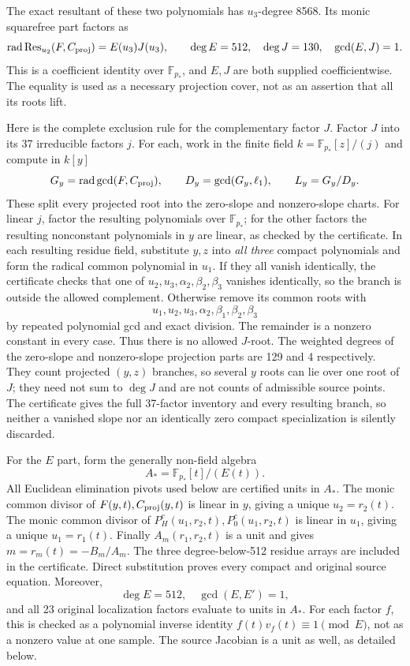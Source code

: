 \documentclass[11pt,a4paper]{article}
\theoremstyle{remark}\newtheorem{remark}[theorem]{Remark}
\begin{document}
The exact resultant of these two polynomials has $u_3$-degree 8568.
Its monic squarefree part factors as
\begin{equation}\label{generic:projectionfactor}
 \operatorname{rad}\operatorname{Res}_{u_2}(F,C_{\rm proj})
   =E(u_3)J(u_3),\qquad \deg E=512,\quad\deg J=130,
 \quad\gcd(E,J)=1.
\end{equation}
This is a coefficient identity over $\mathbb F_{p_*}$, and $E,J$ are
both supplied coefficientwise. The equality is used as a necessary
projection cover, not as an assertion that all its roots lift.

Here is the complete exclusion rule for the complementary factor $J$.
Factor $J$ into its 37 irreducible factors $j$. For each, work in the
finite field $k=\mathbb F_{p_*}[z]/(j)$ and compute in $k[y]$
\[
 G_y=\operatorname{rad}\gcd(F,C_{\rm proj}),\qquad
 D_y=\gcd(G_y,\ell_1),\qquad L_y=G_y/D_y.
\]
These split every projected root into the zero-slope and nonzero-slope
charts. For linear $j$, factor the resulting polynomials over
$\mathbb F_{p_*}$; for the other factors the resulting nonconstant
polynomials in $y$ are linear, as checked by the certificate. In each
resulting residue field, substitute $y,z$ into \emph{all three} compact
polynomials and form the radical common polynomial in $u_1$.
If they all vanish identically, the certificate checks that one of
$u_2,u_3,\alpha_2,\beta_2,\beta_3$ vanishes identically, so the branch
is outside the allowed complement. Otherwise remove its common roots
with
\[
 u_1,u_2,u_3,\alpha_2,\beta_1,\beta_2,\beta_3
\]
by repeated polynomial gcd and exact division. The remainder is a nonzero
constant in every case. Thus there is no allowed $J$-root. The weighted
degrees of the zero-slope and nonzero-slope projection parts are 129 and
4 respectively. They count projected $(y,z)$ branches, so several $y$
roots can lie over one root of $J$; they need not sum to $\deg J$ and
are not counts of admissible source points.
The certificate gives the full 37-factor inventory and every resulting
branch, so neither a vanished slope nor an identically zero compact
specialization is silently discarded.

For the $E$ part, form the generally non-field algebra
\[
 A_*=\mathbb F_{p_*}[t]/(E(t)).
\]
All Euclidean elimination pivots used below are certified units in $A_*$.
The monic common divisor of $F(y,t),C_{\rm proj}(y,t)$ is linear in $y$,
giving a unique $u_2=r_2(t)$. The monic common divisor of
$P_H^c(u_1,r_2,t),P_0^c(u_1,r_2,t)$ is linear in $u_1$, giving a unique
$u_1=r_1(t)$. Finally $A_m(r_1,r_2,t)$ is a unit and gives
$m=r_m(t)=-B_m/A_m$. The three degree-below-512 residue arrays are
included in the certificate. Direct substitution proves every compact
and original source equation. Moreover,
\[
 \deg E=512,\quad\gcd(E,E')=1,
\]
and all 23 original localization factors evaluate to units in $A_*$.
For each factor $f$, this is checked as a polynomial inverse identity
$f(t)v_f(t)\equiv1\pmod E$, not as a nonzero value at one sample.
The source Jacobian is a unit as well, as detailed below.
\end{document}
